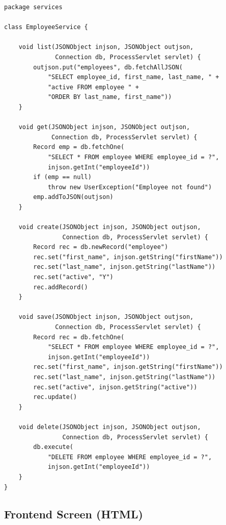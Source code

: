 \begin{lstlisting}[style=groovy]
package services

class EmployeeService {

    void list(JSONObject injson, JSONObject outjson,
              Connection db, ProcessServlet servlet) {
        outjson.put("employees", db.fetchAllJSON(
            "SELECT employee_id, first_name, last_name, " +
            "active FROM employee " +
            "ORDER BY last_name, first_name"))
    }

    void get(JSONObject injson, JSONObject outjson,
             Connection db, ProcessServlet servlet) {
        Record emp = db.fetchOne(
            "SELECT * FROM employee WHERE employee_id = ?",
            injson.getInt("employeeId"))
        if (emp == null)
            throw new UserException("Employee not found")
        emp.addToJSON(outjson)
    }

    void create(JSONObject injson, JSONObject outjson,
                Connection db, ProcessServlet servlet) {
        Record rec = db.newRecord("employee")
        rec.set("first_name", injson.getString("firstName"))
        rec.set("last_name", injson.getString("lastName"))
        rec.set("active", "Y")
        rec.addRecord()
    }

    void save(JSONObject injson, JSONObject outjson,
              Connection db, ProcessServlet servlet) {
        Record rec = db.fetchOne(
            "SELECT * FROM employee WHERE employee_id = ?",
            injson.getInt("employeeId"))
        rec.set("first_name", injson.getString("firstName"))
        rec.set("last_name", injson.getString("lastName"))
        rec.set("active", injson.getString("active"))
        rec.update()
    }

    void delete(JSONObject injson, JSONObject outjson,
                Connection db, ProcessServlet servlet) {
        db.execute(
            "DELETE FROM employee WHERE employee_id = ?",
            injson.getInt("employeeId"))
    }
}
\end{lstlisting}

\subsection{Frontend Screen (HTML)}

